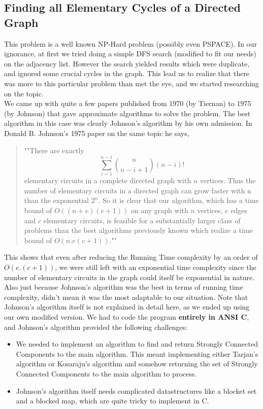 \documentclass{article}
\begin{document}
\subsection{Finding all Elementary Cycles of a Directed Graph}
This problem is a well known NP-Hard problem (possibly even PSPACE). In our ignorance, at first we tried doing a simple DFS search (modified to fit our needs) on the adjacency list. However the search yielded results which were duplicate, and ignored some crucial cycles in the graph. This lead us to realize that there was more to this particular problem than met the eye, and we started researching on the topic.\\
We came up with quite a few papers published from 1970 (by Tiernan) to 1975 (by Johnson) that gave approximate algorithms to solve the problem. The best algorithm in this case was clearly Johnson's algorithm by his own admission. In Donald B. Johnson's 1975 paper on the same topic he says,
\begin{quote}
    ""There are exactly $$\sum_{i=1}^{n-1} \binom{n}{n-i+1}(n-i)!$$ elementary circuits in a complete directed graph with $n$ vertices. Thus the number of elementary circuits in a directed graph can grow faster with n than the exponential $2^n$. So it is clear that our algorithm, which has a time bound of $O((n + e)(c + 1))$ on any graph with $n$ vertices, $e$ edges and $c$ elementary circuits, is feasible for a substantially larger class of problems than the best algorithms previously known which realize a time bound of $O(n. e(c + 1))$.""
\end{quote} 
This shows that even after reducing the Running Time complexity by an order of $O(e.(c+1))$, we were still left with an exponential time complexity since the number of elementary circuits in the graph could itself be exponential in nature.\\
Also just because Johnson's algorithm was the best in terms of running time complexity, didn't mean it was the most adaptable to our situation. Note that Johnson's algorithm itself is not explained in detail here, as we ended up using our own modified version. We had to code the program \textbf{entirely in ANSI C}, and Johnson's algorithm provided the following challenges:
\begin{itemize}
    \item We needed to implement an algorithm to find and return Strongly Connected Components to the main algorithm. This meant implementing either Tarjan's algorithm or Kosaraju's algorithm and somehow returning the set of Strongly Connected Components to the main algorithm to process.
    \item Johnson's algorithm itself needs complicated datastructures like a blocket set and a blocked map, which are quite tricky to implement in C.
\end{itemize}
\end{document}

